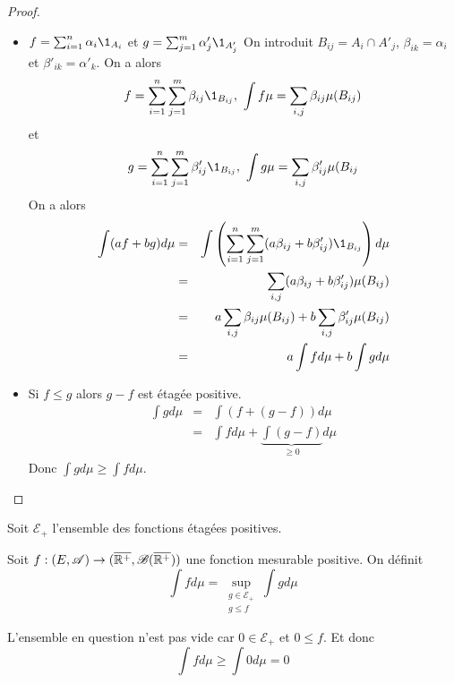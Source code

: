 \begin{proof}
	\begin{itemize}
		\item $ f = \sum_{i=1}^n \alpha_i \1_{A_i} $ et $ g = \sum_{j=1}^m \alpha'_j \1_{A'_j} $
		      On introduit $B_{ij} = A_i \cap A'_j$, $\beta_{ik} = \alpha_i$ et $\beta'_{ik} = \alpha'_k$.
		      On a alors
		      $$ f = \sum_{i=1}^n \sum_{j=1}^m \beta_{ij} \1_{B_{ij}}, \ \int f \mu = \sum_{i,j} \beta_{ij} \mu(B_{ij}) $$
		      et
		      $$ g = \sum_{i=1}^n \sum_{j=1}^m \beta'_{ij} \1_{B_{ij}}, \ \int g \mu = \sum_{i,j} \beta'_{ij} \mu(B_{ij} $$
		      On a alors
		      \begin{eqnarray*}
			      \int (af + bg) d\mu & = & \int \left( \sum_{i=1}^n \sum_{j=1}^m (a\beta_{ij} + b\beta'_{ij}) \1_{B_{ij}} \right) d\mu \\
			      & = & \sum_{i,j} (a\beta_{ij} + b\beta'_{ij}) \mu(B_{ij}) \\
			      & = & a \sum_{i,j} \beta_{ij} \mu(B_{ij}) + b \sum_{i,j} \beta'_{ij} \mu(B_{ij}) \\
			      & = & a \int f d\mu + b \int g d\mu
		      \end{eqnarray*}
		\item Si $f \leq g$ alors $g - f $ est étagée positive.
		      \begin{eqnarray*}
			      \int g d\mu & = & \int (f + (g-f)) d\mu \\
			      & = & \int f d\mu + \underbrace{\int (g-f)}_{\geq 0} d\mu
		      \end{eqnarray*}
		      Donc $\int g d\mu \geq \int f d\mu$.
	\end{itemize}
\end{proof}

Soit  $\mathcal{E}_+$ l'ensemble des fonctions étagées positives.


\begin{definition}
	Soit $f: (E, \mathscr{A}) \to (\overline{\mathbb{R}^+}, \mathscr{B}(\overline{\mathbb{R}^+}))$ une fonction mesurable positive.
	On définit
	$$ \int f d\mu = \sup\limits_{\substack{g \in \mathcal{E}_+ \\ g \leq f}} \int g d\mu $$
\end{definition}

\begin{remarque}
	L'ensemble en question n'est pas vide car $0 \in \mathcal{E}_+$ et $0 \leq f$. Et donc
	$$ \int f d\mu \geq \int 0 d\mu = 0 $$
\end{remarque}


